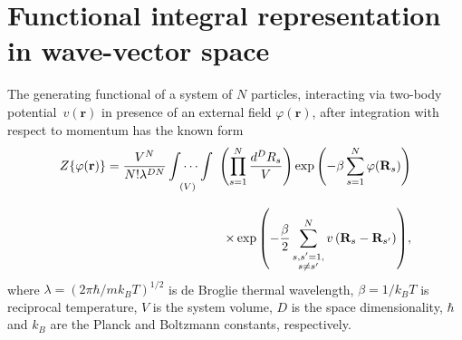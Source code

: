 \documentclass[aps,pre,preprint,floatfix,twoside,tightenlines,showpacs,
showkeys]{revtex4}
\begin{document}
\section{Functional integral representation in wave-vector space}

The generating functional of a system of $N$ particles, interacting via two-body potential~$v\left(\textbf{r}\right)$ in presence of an external field $\varphi\left(\textbf{r}\right)$, after integration with respect to momentum has the known form
%
\begin{equation}\label{Stat}
\begin{array}{r}
{\displaystyle
Z{\left\{  \varphi(\mathbf{r})\right\} } =\frac{V^{N}}{N!\lambda^{DN}} \idotsint\limits_{(V)}\ \left(\prod^{N}_{s=1}\frac{d^{D}R_{s}}{V}\right)\exp\left( -\beta\sum\limits_{s=1}^N \varphi(\textbf{R}_s)\right)}\\ \\
{\displaystyle
\times
\exp\left(-\frac{\beta}{2}\sum\limits_{\stackrel{\scriptstyle s,s'=1,}{s\neq s'}  }^{N} v\left(\textbf{R}_{s} - \textbf{R}_{s'}\right)\right)}{,}
\end{array}
\end{equation}
where $\lambda=\left(2\pi\hbar/m k_{B}T\right)^{1/2}$ is de Broglie thermal wavelength, $\beta=1/k_{B}T$ is reciprocal temperature, $V$ is the system volume, $D$ is the space dimensionality, $\hbar$ and $k_{B}$ are the Planck and Boltzmann constants, respectively.
\end{document}
